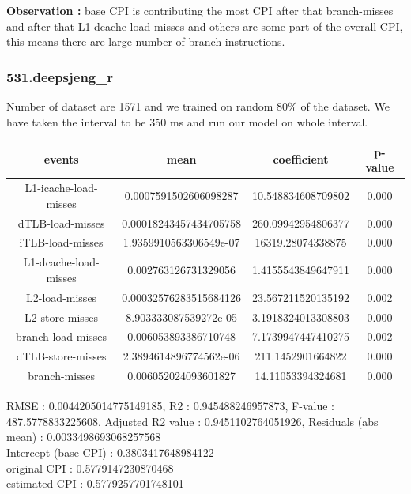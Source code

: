 \documentclass[10pt, letterpaper, IEEEtran, tikz,border=5,a4paper,fleqn]{article}
\begin{document}
\noindent \textbf{Observation :} base CPI is contributing the most CPI after that branch-misses and after that L1-dcache-load-misses and others are some part of the overall CPI, this means there are large number of branch instructions.

\subsubsection{531.deepsjeng\_r}

Number of dataset are 1571 and we trained on random 80\% of the dataset. We have taken the interval to be 350 ms and run our model on whole interval.
\begin{center}
\begin{tabular}{||c c c c||}
 \hline
 \textbf{events} & \textbf{mean} & \textbf{coefficient} & \textbf{p-value}\\ [0.5ex]
 \hline\hline
 L1-icache-load-misses & 0.0007591502606098287 & 10.548834608709802 & 0.000\\
 \hline
 dTLB-load-misses & 0.00018243457434705758 & 260.09942954806377 & 0.000\\
 \hline
 iTLB-load-misses & 1.9359910563306549e-07 & 16319.28074338875 & 0.000\\
 \hline
 L1-dcache-load-misses & 0.002763126731329056 & 1.4155543849647911 & 0.000\\
 \hline
 L2-load-misses & 0.00032576283515684126 & 23.567211520135192 & 0.002\\
 \hline
 L2-store-misses & 8.903333087539272e-05 & 3.1918324013308803 & 0.000\\
 \hline
 branch-load-misses & 0.006053893386710748 & 7.1739947447410275 & 0.002\\
 \hline
 dTLB-store-misses & 2.3894614896774562e-06 & 211.1452901664822 & 0.000\\
 \hline
 branch-misses & 0.006052024093601827 & 14.11053394324681 & 0.000\\
 \hline
\end{tabular}
\end{center}
RMSE : 0.0044205014775149185,
R2 : 0.945488246957873,
F-value : 487.5778833225608,
Adjusted R2 value : 0.9451102764051926,
Residuals (abs mean) : 0.0033498693068257568\\

\noindent Intercept (base CPI) : 0.3803417648984122\\
original CPI : 0.5779147230870468\\
estimated CPI : 0.5779257701748101\\
\end{document}
